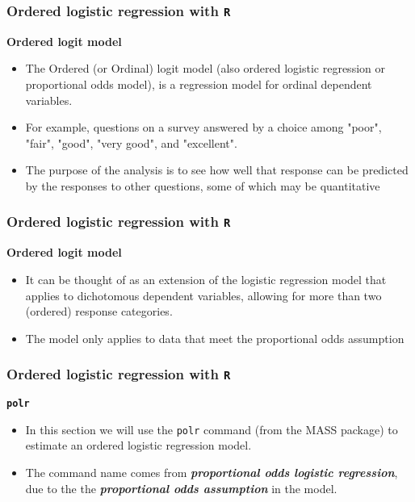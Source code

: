 \documentclass[00-GLMregslides.tex]{subfiles}
\begin{document}
\begin{frame}
\frametitle{Ordered logistic regression with \texttt{R} }
\textbf{Ordered logit model}

\begin{itemize}
\item The Ordered (or Ordinal) logit model (also ordered logistic regression or proportional odds model), is a regression model for ordinal dependent variables. 
\item For example, questions on a survey answered by a choice among "poor", "fair", "good", "very good", and "excellent".
\item The purpose of 
the analysis is to see how well that response can be predicted by the responses to other questions, some of which may be quantitative
\end{itemize}

\end{frame}


\begin{frame}
\frametitle{Ordered logistic regression with \texttt{R} }
\Large
\textbf{Ordered logit model}

\begin{itemize}
\item It can be thought of as an extension of the 
logistic regression model that applies to dichotomous dependent variables, allowing for more than two (ordered) response categories.
\item The model only applies to data that meet the proportional odds assumption
\end{itemize}
\end{frame}


\begin{frame}[fragile]
\frametitle{Ordered logistic regression with \texttt{R} }
	\Large
\textbf{\texttt{polr}}
\begin{itemize}
\item In this section we will use the \texttt{polr} command (from the MASS package) to estimate an ordered logistic 
regression model. 
\item The command name comes from \textbf{\textit{proportional odds logistic regression}}, due to the the \textbf{\textit{proportional odds assumption}} in the model. 
\end{itemize}
\end{frame}
\end{document}
